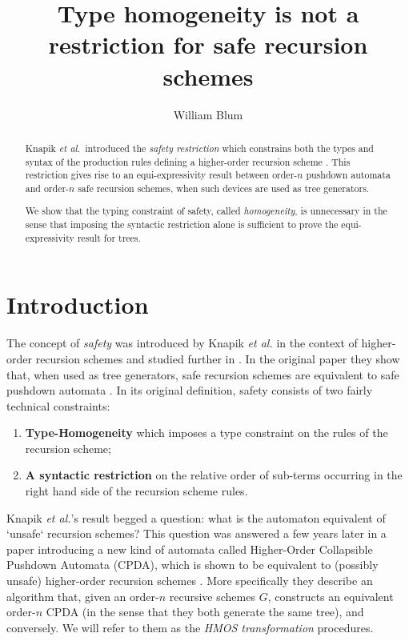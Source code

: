 \documentclass[a4paper]{article}[12pt]
\author{William Blum}
\title{Type homogeneity is not a restriction for safe recursion schemes}
\theoremstyle{remark}
\theoremstyle{definition}
\begin{document}
\maketitle
\begin{abstract}
Knapik \emph{et al.\ }introduced the \emph{safety restriction} which constrains both the types and syntax of the production rules defining a higher-order recursion scheme \cite{KNU02}. This restriction gives rise to an equi-expressivity result between order-$n$ pushdown automata and order-$n$ safe recursion schemes, when such devices are used as tree generators.

We show that the typing constraint of safety, called \emph{homogeneity}, is unnecessary in the sense that imposing the syntactic restriction alone is sufficient to prove the equi-expressivity result for trees.
\end{abstract}

\section{Introduction}
The concept of \emph{safety} was introduced by Knapik \emph{et al.} in the
context of higher-order recursion schemes and studied further in \cite{KNU02,
demirandathesis}. In the original paper they show that, when used as tree
generators, safe recursion schemes are equivalent to safe pushdown automata
\cite{KNU02}.
In its original definition, safety consists of two fairly technical constraints:
\begin{enumerate}
\item \textbf{Type-Homogeneity} which imposes a type constraint on the rules of
the recursion scheme;
\item \textbf{A syntactic restriction} on the relative order of sub-terms
occurring in the right hand side of the recursion scheme rules.
\end{enumerate}

Knapik \emph{et al.}'s result begged a question: what is the automaton
equivalent of `unsafe` recursion schemes?
This question was answered a few years later in a paper introducing a new kind
of automata called Higher-Order Collapsible Pushdown Automata (CPDA), which is
shown to be equivalent to (possibly unsafe) higher-order recursion schemes
\cite{hmos-lics08}. More specifically they describe an algorithm that, given an
order-$n$ recursive schemes $G$, constructs an equivalent order-$n$ CPDA (in the
sense that they both generate the same tree), and conversely. We will refer to
them as the \emph{HMOS transformation} procedures.
\end{document}

